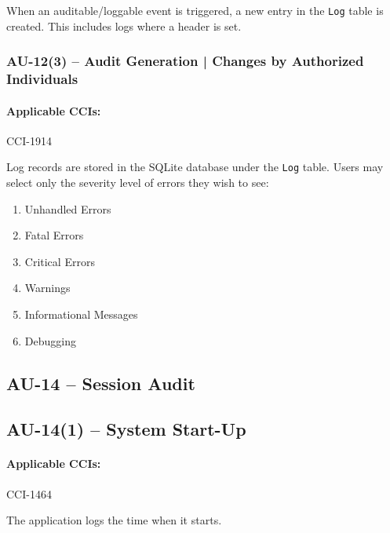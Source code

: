 \documentclass[letterpaper, 10pt, twoside]{article}
\begin{document}
When an auditable/loggable event is triggered, a new entry in the \texttt{Log} table is created. This includes logs where a header is set.

\subsubsection{AU-12(3) -- Audit Generation | Changes by Authorized Individuals}

\paragraph{Applicable CCIs:} CCI-1914

Log records are stored in the SQLite database under the \texttt{Log} table. Users may select only the severity level of errors they wish to see:
\begin{enumerate}
	\item Unhandled Errors
	\item Fatal Errors
	\item Critical Errors
	\item Warnings
	\item Informational Messages
	\item Debugging
\end{enumerate}

\subsection{AU-14 -- Session Audit}

\subsection{AU-14(1) -- System Start-Up}

\paragraph{Applicable CCIs:} CCI-1464

The application logs the time when it starts.

\clearpage
\printbibliography
\end{document}
